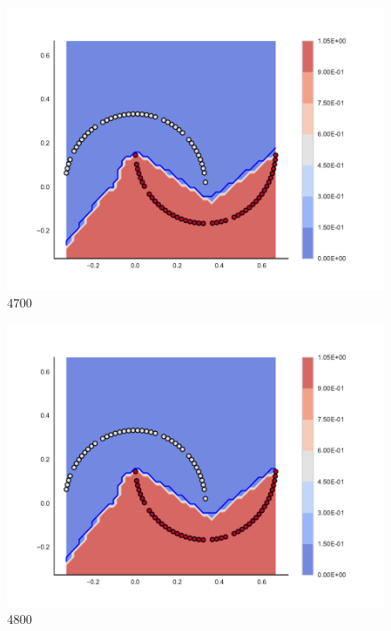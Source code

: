 \begin{subfigure}[b]{0.09\textwidth}
    \includegraphics[clip, trim=2.35cm 1.75cm 4.5cm 0cm,width=\textwidth]{img/convergence/4700.pdf}
    \caption{4700}
    \label{fig:convergence_4700}
\end{subfigure}
%
\begin{subfigure}[b]{0.09\textwidth}
    \includegraphics[clip, trim=2.35cm 1.75cm 4.5cm 0cm,width=\textwidth]{img/convergence/4800.pdf}
    \caption{4800}
    \label{fig:convergence_4800}
\end{subfigure}
%
